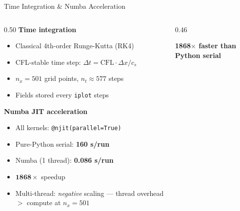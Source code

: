 \documentclass[aspectratio=169,12pt]{beamer}
\begin{document}
\begin{frame}{Time Integration \& Numba Acceleration}
  \begin{columns}[T]
    \begin{column}{0.50\textwidth}
      \textbf{Time integration}
      \begin{itemize}
        \item Classical 4th-order Runge-Kutta (RK4)
        \item CFL-stable time step: $\Delta t = \text{CFL}\cdot\Delta x / c_s$
        \item $n_x = 501$ grid points, $n_t \approx 577$ steps
        \item Fields stored every \texttt{iplot} steps
      \end{itemize}
      \vspace{8pt}
      \textbf{Numba JIT acceleration}
      \begin{itemize}
        \item All kernels: \texttt{@njit(parallel=True)}
        \item Pure-Python serial: \textbf{160 s/run}
        \item Numba (1 thread): \textbf{0.086 s/run}
        \item \alert{$\bm{1868\times}$ speedup}
        \item Multi-thread: \textit{negative} scaling — thread overhead $>$ compute at $n_x=501$
      \end{itemize}
    \end{column}
    \begin{column}{0.46\textwidth}
      \vspace{4pt}
      \centering\small\textcolor{mygreen}{\textbf{1868$\times$ faster than Python serial}}
    \end{column}
  \end{columns}
\end{frame}
\end{document}
